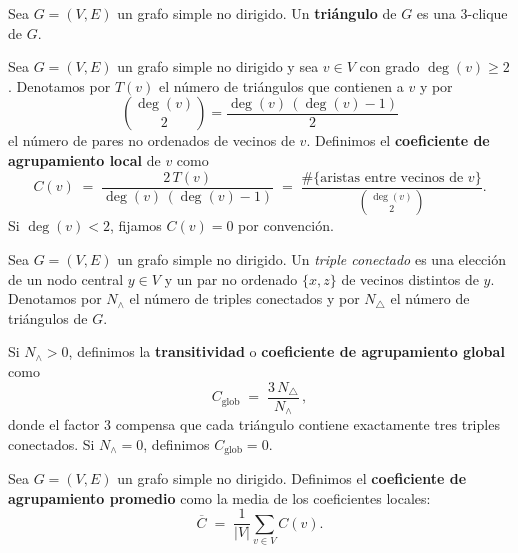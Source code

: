             \begin{definicion}[Triángulo]
                Sea $G=(V,E)$ un grafo simple no dirigido. Un \textbf{triángulo} de $G$ es una $3$-clique de $G$.
            \end{definicion}

            \begin{definicion}
                Sea $G=(V,E)$ un grafo simple no dirigido y sea $v\in V$ con grado $\deg(v)\ge 2$. Denotamos por $T(v)$ el número de triángulos que contienen a $v$ y por 
                \[
                \binom{\deg(v)}{2}=\frac{\deg(v)\,(\deg(v)-1)}{2}
                \]
                el número de pares no ordenados de vecinos de $v$. Definimos el \textbf{coeficiente de agrupamiento local} de $v$ como
                \[
                C(v)\;=\;\frac{2\,T(v)}{\deg(v)\,(\deg(v)-1)}\;=\;\frac{\#\{\text{aristas entre vecinos de }v\}}{\binom{\deg(v)}{2}}.
                \]
                Si $\deg(v)<2$, fijamos $C(v)=0$ por convención.
            \end{definicion}
            
            \begin{definicion}
                Sea $G=(V,E)$ un grafo simple no dirigido. Un \emph{triple conectado} es una elección de un nodo central $y\in V$ y un par no ordenado $\{x,z\}$ de vecinos distintos de $y$. Denotamos por $N_\wedge$ el número de triples conectados y por $N_\triangle$ el número de triángulos de $G$.

                Si $N_\wedge>0$, definimos la \textbf{transitividad} o \textbf{coeficiente de agrupamiento global} como
                \[
                C_{\mathrm{glob}}\;=\;\frac{3\,N_\triangle}{N_\wedge}\,,
                \]
                donde el factor $3$ compensa que cada triángulo contiene exactamente tres triples conectados.
                Si $N_\wedge=0$, definimos $C_{\mathrm{glob}}=0$.
            \end{definicion}
            
            \begin{definicion}
                Sea $G=(V,E)$ un grafo simple no dirigido. Definimos el \textbf{coeficiente de agrupamiento promedio} como la media de los coeficientes locales:
                \[
                \overline{C}\;=\;\frac{1}{|V|}\sum_{v\in V} C(v).
                \]
            \end{definicion}
            
